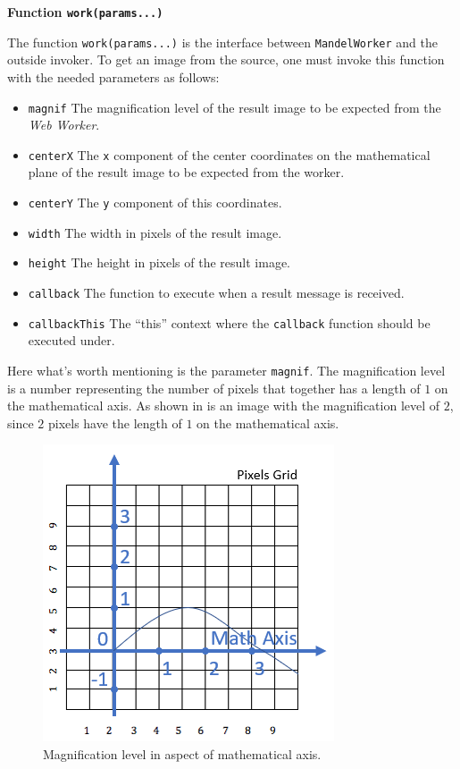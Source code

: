 \textbf{Function \texttt{work(params...)}}

The function \texttt{work(params...)} is the interface between \texttt{MandelWorker} and the outside invoker. To get an image from the source, one must invoke this function with the needed parameters as follows:

\begin{itemize}
  \item \texttt{magnif} The magnification level of the result image to be expected from the \emph{Web Worker}.
  \item \texttt{centerX} The \texttt{x} component of the center coordinates on the mathematical plane of the result image to be expected from the worker.
  \item \texttt{centerY} The \texttt{y} component of this coordinates.
  \item \texttt{width} The width in pixels of the result image.
  \item \texttt{height} The height in pixels of the result image.
  \item \texttt{callback} The function to execute when a result message is received.
  \item \texttt{callbackThis} The ``this'' context where the \texttt{callback} function should be executed under.
\end{itemize}

Here what's worth mentioning is the parameter \texttt{magnif}. The magnification level is a number representing the number of pixels that together has a length of $1$ on the mathematical axis. As shown in  is an image with the magnification level of $2$, since $2$ pixels have the length of $1$ on the mathematical axis.

\begin{figure}[th]
\centering
\includegraphics[keepaspectratio]{Figures/Chapter4/magnif.png}
\decoRule
\caption[Magnification Level]{Magnification level in aspect of mathematical axis.}
\label{fig:magnif}
\end{figure}


